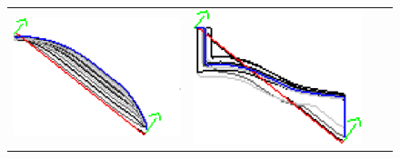 \begin{figure}
\begin{tabular}{cccc}
\includegraphics[scale=0.2]{figures/chapter9/constrained-elastica/graphflow/curve-2/len_pen-0.0002/radius-7/N-1/h1.0/summary.pdf} &
\includegraphics[scale=0.2]{figures/chapter9/constrained-elastica/graphflow/curve-2/len_pen-0.0002/radius-50/N-1/h1.0/summary.pdf}\\


\end{tabular}
\end{figure}
